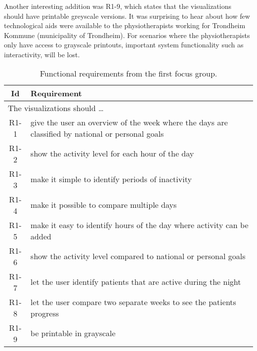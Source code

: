 Another interesting addition was R1-9, which states that the visualizations should have printable greyscale versions. It was surprising to hear about how few technological aids were available to the physiotherapists working for Trondheim Kommune (municipality of Trondheim). For scenarios where the physiotherapists only have access to grayscale printouts, important system functionality such as interactivity, will be lost.

\clearpage

\begin{table}[h!]
  \begin{center}
  \begin{tabular}{|c|p{12cm}|}
    \hline
      \textbf{Id} & \textbf{Requirement} \\ \hline
    \multicolumn{2}{|l|}{The visualizations should \ldots} \\ \hline
      R1-1 & give the user an overview of the week where the days are classified by national or personal goals \\ \hline
      R1-2 & show the activity level for each hour of the day \\ \hline
      R1-3 & make it simple to identify periods of inactivity \\ \hline
      R1-4 & make it possible to compare multiple days \\ \hline
      R1-5 & make it easy to identify hours of the day where activity can be added \\ \hline
      R1-6 & show the activity level compared to national or personal goals \\ \hline
      R1-7 & let the user identify patients that are active during the night \\ \hline
      R1-8 & let the user compare two separate weeks to see the patients progress \\ \hline
      R1-9 & be printable in grayscale \\ \hline
  \end{tabular}
  \end{center}
  \caption[Functional requirements after the first focus group.]{Functional requirements from the first focus group.}
  \label{tab:f1Req}
\end{table}

